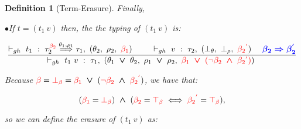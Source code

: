 \documentclass[a4paper,11pt,oneside]{article}
\theoremstyle{plain}
\newtheorem{definition}{Definition}[subsection]
\newcommand{\rouge}[1]{\textcolor{red}{#1}}
\newcommand{\bwedge}{\boldsymbol{~\wedge~}}
\newcommand{\bvee}{\boldsymbol{~\vee~}}
\newcommand{\ghosttyping}[6]{\vdash_{gh}~#1~:~#2,~(#3,~#4,~\rouge{#5})~\textcolor{blue}{\boldsymbol{#6}}}
\newcommand{\bth}{\bot_\theta}
\newcommand{\brh}{\bot_\rho}
\newcommand{\trh}{\top_\rho}
\newcommand{\gb}{\beta}
\newcommand{\gba}[1]{\beta_{#1}}
\newcommand{\gbb}{\bot_\beta}
\newcommand{\gbt}{\top_\beta}
\newcommand{\gbr}{\textcolor{red}{\gb}}
\newcommand{\gbra}[1]{\textcolor{red}{\gba{#1}}}
\newcommand{\gbbr}{\textcolor{red}{\gbb}}
\newcommand{\gbtr}{\textcolor{red}{\gbt}}
\newcommand{\gbran}[1]{\textcolor{red}{\neg\gba{#1}}}
\newcommand{\e}{\mathcal{E}}
\newcommand{\ebot}[1]{\e_{\gbbr}(#1)}
\newcommand{\egbra}[2]{\e_{\gbra{#1}}(#2)}
\begin{document}
\begin{definition}[Term-Erasure]
Finally, 

\noindent$\bullet$\quad If $t = (t_1~v)$ then, the the typing of $(t_1~v)$ is:
\begin{small}
$$ \dfrac
	{
		\ghosttyping
			{t_1}
			{{\tau_{2}^{\gbra{2}} \stackrel{\theta_1, \rho_1}{\Longrightarrow} \tau_1}}
			{\theta_2}
			{\rho_2}
			{\gbra{1}}
			{} \qquad
		\ghosttyping
		{v}
		{\tau_2}
		{\bth}
		{\brh}
		{\gbra{2}^{\rouge{'}}}
		{\quad \gba{2} \Rightarrow \gba{2}^{'}}}
	{
		\ghosttyping
			{t_1~v}
			{\tau_1}
			{\theta_1 \bvee \theta_2}
			{\rho_1 \bvee \rho_2}
			{\gbra{1} \bvee (\gbran{2} \bwedge \gbra{2}^{\rouge{'}})}
			{}} $$
\end{small}
Because $\gbr =  \gbbr = \gbra{1} \bvee (\gbran{2} \bwedge \gbra{2}^{\rouge{'}})$, we have that: 
\begin{small}
$$(\gbra{1} = \gbbr) \bwedge (\gbra{2} = \gbtr  \iff  \gbra{2}^{\rouge{'}} = \gbtr),$$
\end{small} 
so we can define the erasure of $(t_1~v)$ as:
\begin{small}
\begin{adjustwidth}{-4cm}{3cm}
\begin{displaymath} 
\begin{array}{llll}

\end{array}
\end{displaymath}
\end{adjustwidth}
\end{small}
\end{definition}
\end{document}
